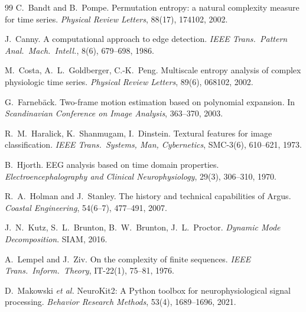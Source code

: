 \documentclass[11pt,a4paper]{article}
\begin{document}
\begingroup
\renewcommand{\section}[2]{}
\begin{thebibliography}{99}\small
{}
C.~Bandt and B.~Pompe.
\newblock Permutation entropy: a natural complexity measure for time series.
\newblock \emph{Physical Review Letters}, 88(17), 174102, 2002.

J.~Canny.
\newblock A computational approach to edge detection.
\newblock \emph{IEEE Trans.\ Pattern Anal.\ Mach.\ Intell.}, 8(6), 679--698, 1986.

M.~Costa, A.~L.~Goldberger, C.-K.~Peng.
\newblock Multiscale entropy analysis of complex physiologic time series.
\newblock \emph{Physical Review Letters}, 89(6), 068102, 2002.

G.~Farneb\"ack.
\newblock Two-frame motion estimation based on polynomial expansion.
\newblock In \emph{Scandinavian Conference on Image Analysis}, 363--370, 2003.

R.~M.~Haralick, K.~Shanmugam, I.~Dinstein.
\newblock Textural features for image classification.
\newblock \emph{IEEE Trans.\ Systems, Man, Cybernetics}, SMC-3(6), 610--621, 1973.

B.~Hjorth.
\newblock EEG analysis based on time domain properties.
\newblock \emph{Electroencephalography and Clinical Neurophysiology}, 29(3), 306--310, 1970.

R.~A.~Holman and J.~Stanley.
\newblock The history and technical capabilities of Argus.
\newblock \emph{Coastal Engineering}, 54(6--7), 477--491, 2007.

J.~N.~Kutz, S.~L.~Brunton, B.~W.~Brunton, J.~L.~Proctor.
\newblock \emph{Dynamic Mode Decomposition}. SIAM, 2016.

A.~Lempel and J.~Ziv.
\newblock On the complexity of finite sequences.
\newblock \emph{IEEE Trans.\ Inform.\ Theory}, IT-22(1), 75--81, 1976.

D.~Makowski \emph{et al.}
\newblock NeuroKit2: A Python toolbox for neurophysiological signal processing.
\newblock \emph{Behavior Research Methods}, 53(4), 1689--1696, 2021.


\end{thebibliography}
\end{document}
